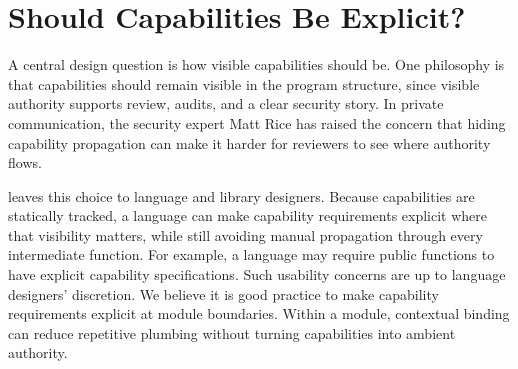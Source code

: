 
\section{Should Capabilities Be Explicit?}
\label{sec:explicit-capabilities}

A central design question is how visible capabilities should be. %
One philosophy is that capabilities should remain visible in the program
structure, since visible authority supports review, audits, and a clear
security story. %
In private communication, the security expert Matt Rice has raised the concern
that hiding capability propagation can make it harder for reviewers to see
where authority flows. %

\lambdaCC{} leaves this choice to language and library designers. %
Because capabilities are statically tracked, a language can make capability
requirements explicit where that visibility matters, while still avoiding
manual propagation through every intermediate function. %
For example, a language may require public functions to have explicit capability
specifications. %
Such usability concerns are up to language designers' discretion. %
We believe it is good practice to make capability requirements explicit at
module boundaries. %
Within a module, contextual binding can reduce repetitive plumbing without
turning capabilities into ambient authority. %
